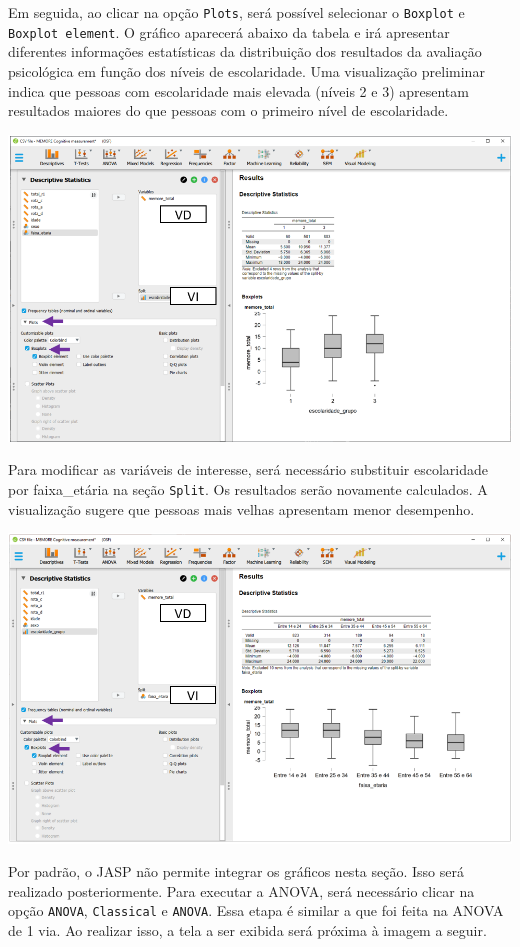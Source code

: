 \documentclass[
]{book}
\begin{document}
Em seguida, ao clicar na opção \texttt{Plots}, será possível selecionar
o \texttt{Boxplot} e \texttt{Boxplot\ element}. O gráfico aparecerá
abaixo da tabela e irá apresentar diferentes informações estatísticas da
distribuição dos resultados da avaliação psicológica em função dos
níveis de escolaridade. Uma visualização preliminar indica que pessoas
com escolaridade mais elevada (níveis 2 e 3) apresentam resultados
maiores do que pessoas com o primeiro nível de escolaridade.

\includegraphics{./img/cap_anova_two_way_plot.png}

Para modificar as variáveis de interesse, será necessário substituir
escolaridade por faixa\_etária na seção \texttt{Split}. Os resultados
serão novamente calculados. A visualização sugere que pessoas mais
velhas apresentam menor desempenho.

\includegraphics{./img/cap_anova_two_way_plot1.png}

Por padrão, o JASP não permite integrar os gráficos nesta seção. Isso
será realizado posteriormente. Para executar a ANOVA, será necessário
clicar na opção \texttt{ANOVA}, \texttt{Classical} e \texttt{ANOVA}.
Essa etapa é similar a que foi feita na ANOVA de 1 via. Ao realizar
isso, a tela a ser exibida será próxima à imagem a seguir.
\end{document}
